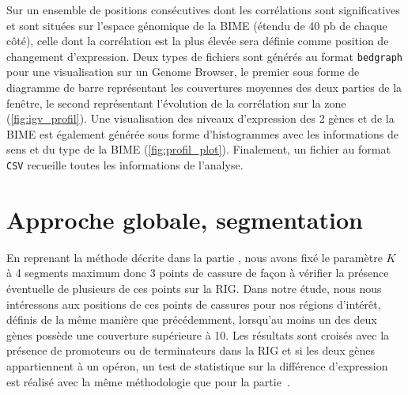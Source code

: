 \documentclass[12pt,a4paper]{report}
\begin{document}
\begin{onehalfspace}
Sur un ensemble de positions consécutives dont les corrélations sont significatives et sont situées sur l'espace génomique de la BIME (étendu de 40 pb de chaque côté), celle dont la corrélation est la plus élevée sera définie comme position de changement d'expression. Deux types de fichiers sont générés au format \texttt{bedgraph} pour une visualisation sur un Genome Browser, le premier sous forme de diagramme de barre représentant les couvertures moyennes des deux parties de la fenêtre, le second représentant l'évolution de la corrélation sur la zone (\autoref{fig:igv_profil}). Une visualisation des niveaux d'expression des 2 gènes et de la BIME est également générée sous forme d'histogrammes avec les informations de sens et du type de la BIME (\autoref{fig:profil_plot}). Finalement, un fichier au format \texttt{CSV} recueille toutes les informations de l'analyse.

\section*{Approche globale, segmentation}

En reprenant la méthode décrite dans la partie , nous avons fixé le paramètre $K$ à 4 segments maximum donc 3 points de cassure de façon à vérifier la présence éventuelle de plusieurs de ces points sur la RIG.
Dans notre étude, nous nous intéressons aux positions de ces points de cassures pour nos régions d'intérêt, définis de la même manière que précédemment, lorsqu'au moins un des deux gènes possède une couverture supérieure à 10. Les résultats sont croisés avec la présence de promoteurs ou de terminateurs dans la RIG et si les deux gènes appartiennent à un opéron, un test de statistique sur la différence d'expression est réalisé avec la même méthodologie que pour la partie~.


\end{onehalfspace}
\end{document}
